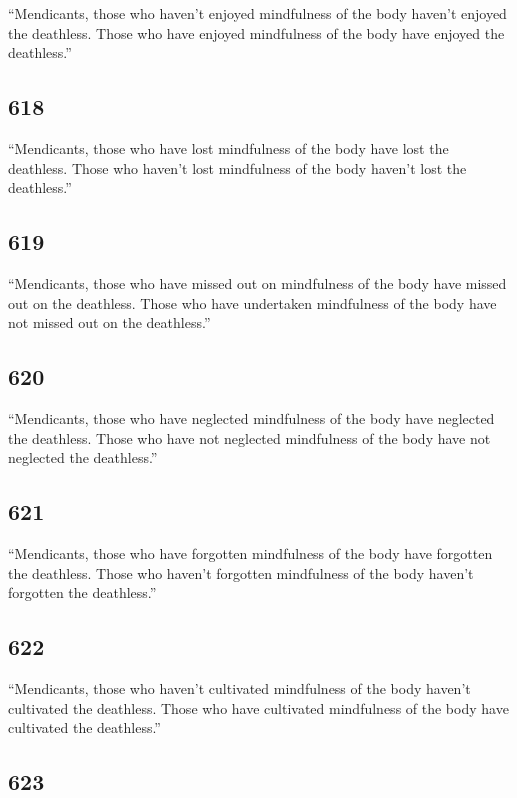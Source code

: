 \documentclass[12pt,openany]{book}%
\begin{document}
“Mendicants, those who haven’t enjoyed mindfulness of the body haven’t enjoyed the deathless. Those who have enjoyed mindfulness of the body have enjoyed the deathless.” 

\subsection*{618 }

“Mendicants, those who have lost mindfulness of the body have lost the deathless. Those who haven’t lost mindfulness of the body haven’t lost the deathless.” 

\subsection*{619 }

“Mendicants, those who have missed out on mindfulness of the body have missed out on the deathless. Those who have undertaken mindfulness of the body have not missed out on the deathless.” 

\subsection*{620 }

“Mendicants, those who have neglected mindfulness of the body have neglected the deathless. Those who have not neglected mindfulness of the body have not neglected the deathless.” 

\subsection*{621 }

“Mendicants, those who have forgotten mindfulness of the body have forgotten the deathless. Those who haven’t forgotten mindfulness of the body haven’t forgotten the deathless.” 

\subsection*{622 }

“Mendicants, those who haven’t cultivated mindfulness of the body haven’t cultivated the deathless. Those who have cultivated mindfulness of the body have cultivated the deathless.” 

\subsection*{623 }
\end{document}
